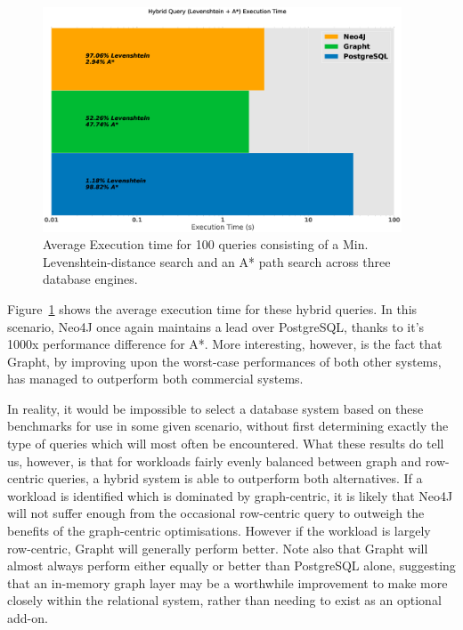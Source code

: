 \begin{figure}[htbp]
	\centering
	\includegraphics[width=0.95\textwidth]{figs/hybridgraph.eps}
	\caption{Average Execution time for 100 queries consisting of a Min. Levenshtein-distance search and an A* path search across three database engines.}
	\label{fig:hybridgraph}
\end{figure}

Figure~\ref{fig:hybridgraph} shows the average execution time for these hybrid
queries. In this scenario, Neo4J once again maintains a lead over PostgreSQL,
thanks to it's 1000x performance difference for A*. More interesting, however,
is the fact that Grapht, by improving upon the worst-case performances of both
other systems, has managed to outperform both commercial systems. 

In reality, it would be impossible to select a database system based on these
benchmarks for use in some given scenario, without first determining exactly
the type of queries which will most often be encountered. What these results
do tell us, however, is that for workloads fairly evenly balanced between
graph and row-centric queries, a hybrid system is able to outperform both
alternatives. If a workload is identified which is dominated by graph-centric,
it is likely that Neo4J will not suffer enough from the occasional row-centric
query to outweigh the benefits of the graph-centric optimisations. However if
the workload is largely row-centric, Grapht will generally perform better.
Note also that Grapht will almost always perform either equally or better than
PostgreSQL alone, suggesting that an in-memory graph layer may be a worthwhile
improvement to make more closely within the relational system, rather than
needing to exist as an optional add-on.



